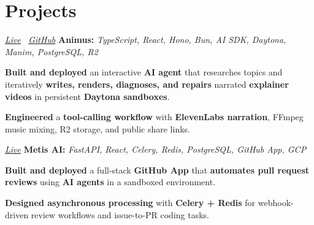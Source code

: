 \section{Projects}

\begin{twocolentry}{
    \textit{\href{https://tryanimus.app/}{Live} \textbar\ \href{https://github.com/KacemMathlouthi/animus}{GitHub}}}
    \textbf{Animus:} \textit{TypeScript, React, Hono, Bun, AI SDK, Daytona, Manim, PostgreSQL, R2}
\end{twocolentry}
\vspace{0.10 cm}
\begin{onecolentry}
    \begin{highlights}
        \item \textbf{Built and deployed} an interactive \textbf{AI agent} that researches topics and iteratively \textbf{writes, renders, diagnoses, and repairs} narrated \textbf{explainer videos} in persistent \textbf{Daytona sandboxes}.
        \item \textbf{Engineered} a \textbf{tool-calling workflow} with \textbf{ElevenLabs narration}, FFmpeg music mixing, R2 storage, and public share links.
    \end{highlights}
\end{onecolentry}
\entrygap

\begin{twocolentry}{
    \textit{\href{https://www.getmetis.tech/}{Live}}}
    \textbf{Metis AI:} \textit{FastAPI, React, Celery, Redis, PostgreSQL, GitHub App, GCP}
\end{twocolentry}
\vspace{0.10 cm}
\begin{onecolentry}
    \begin{highlights}
        \item \textbf{Built and deployed} a full-stack \textbf{GitHub App} that \textbf{automates pull request reviews} using \textbf{AI agents} in a sandboxed environment.
        \item \textbf{Designed asynchronous processing} with \textbf{Celery + Redis} for webhook-driven review workflows and issue-to-PR coding tasks.
    \end{highlights}
\end{onecolentry}

